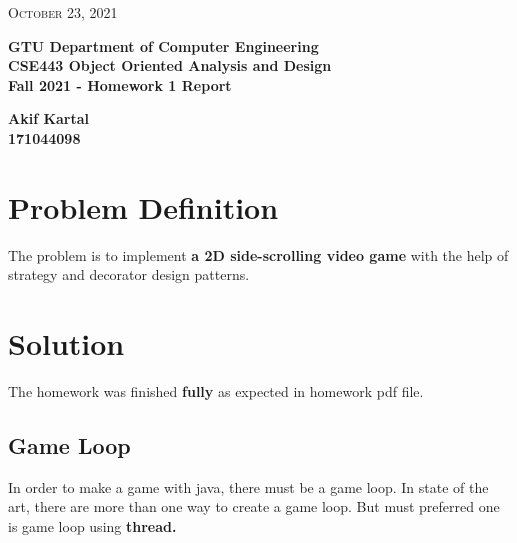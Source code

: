 \documentclass{article}
\begin{document}
\begin{titlepage}

	\begin{flushright}
	\textsc{\large October 23, 2021} \\
	\end{flushright}
	\begin{center}
	\Large{\bfseries GTU Department of Computer Engineering \\ CSE443 Object Oriented Analysis and Design \\ Fall 2021 - Homework 1 Report  } \\
	\end{center}
	\vspace*{\fill}
	\begin{center}
	\Large{\bfseries Akif Kartal \\ 171044098 }
	\end{center}
	\vspace*{\fill}

\end{titlepage}

\cleardoublepage
\section{Problem Definition} 
The problem is to implement \textbf{a 2D side-scrolling video game} with the help of strategy and decorator design patterns.

\section{Solution}
The homework was finished \textbf{fully} as expected in homework pdf file. 
\subsection{Game Loop}
In order to make a game with java, there must be a game loop. In state of the art, there are more than one way to create a game loop. But must preferred
one is game loop using \textbf{thread.} 
\end{document}
